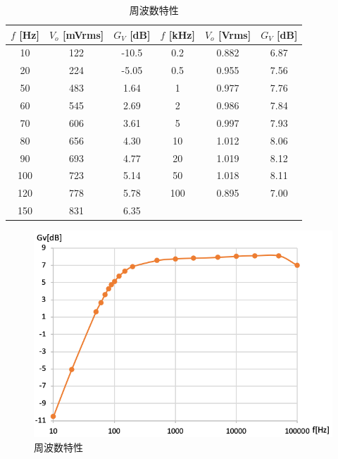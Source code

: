 \documentclass[titlepage]{jsarticle}
\begin{document}
                \begin{table}[h]
                    \caption{周波数特性}
                    \label{tab:amp}
                    \centering
                    \begin{tabular}{ccc||ccc} \hline
                        $f$ [Hz] & $V_o$ [mVrms] & $G_V$ [dB] & $f$ [kHz] & $V_o$ [Vrms] & $G_V$ [dB] \\ \hline
                        10 & 122 & -10.5 & 0.2 & 0.882 & 6.87 \\
                        20 & 224 & -5.05 & 0.5 & 0.955 & 7.56 \\
                        50 & 483 & 1.64 & 1 & 0.977 & 7.76 \\
                        60 & 545 & 2.69 & 2 & 0.986 & 7.84 \\
                        70 & 606 & 3.61 & 5 & 0.997 & 7.93 \\
                        80 & 656 & 4.30 & 10 & 1.012 & 8.06 \\
                        90 & 693 & 4.77 & 20 & 1.019 & 8.12 \\
                        100 & 723 & 5.14 & 50 & 1.018 & 8.11 \\
                        120 & 778 & 5.78 & 100 & 0.895 & 7.00 \\
                        150 & 831 & 6.35 & & & \\ \hline
                    \end{tabular}
                \end{table}

                \begin{figure}[h]
                    \centering
                    \includegraphics[width=0.7\hsize]{images/amp.png}
                    \caption{周波数特性}
                    \label{fig:amp}
                \end{figure}
\end{document}
